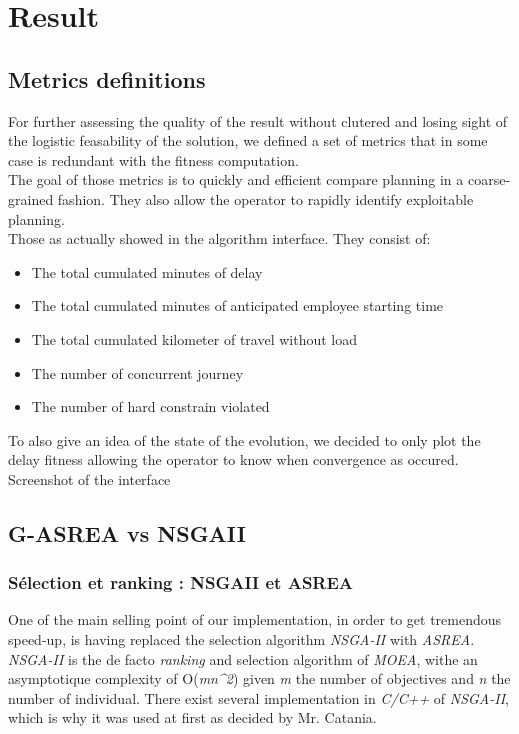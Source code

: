\documentclass[12pt]{memoir}
\begin{document}
\section{Result}
\subsection{Metrics definitions}
For further assessing the quality of the result without clutered and losing sight of the logistic feasability of the solution, we defined a set of metrics that in some case is redundant with the fitness computation. \\
The goal of those metrics is to quickly and efficient compare planning in a coarse-grained fashion. They also allow the operator to rapidly identify exploitable planning.\\
Those as actually showed in the algorithm interface. They consist of: 
\begin{itemize}
  \item The total cumulated minutes of delay
  \item The total cumulated minutes of anticipated employee starting time
  \item The total cumulated kilometer of travel without load
  \item The number of concurrent journey
  \item The number of hard constrain violated
\end{itemize}
To also give an idea of the state of the evolution, we decided to only plot the delay 
fitness allowing the operator to know when convergence as occured.
Screenshot of the interface 
\subsection{G-ASREA vs NSGAII}
\subsubsection{Sélection et ranking : NSGAII et
	ASREA}\label{suxe9lection-et-ranking-nsgaii-et-asrea}

One of the main selling point of our implementation, in order to get tremendous speed-up, is having replaced the selection algorithm \emph{NSGA-II\cite{deb2002fast}} with \emph{ASREA\cite{sharma2010archived,tsutsui2013massively}}.\\

\emph{NSGA-II} is the de facto \emph{ranking} and selection algorithm of \emph{MOEA}, withe an asymptotique complexity of O(\emph{mn\^{}2}) given \emph{m} the number of objectives and \emph{n} the number of individual.
There exist several implementation in \emph{C/C++} of \emph{NSGA-II}, which is why it was used at first as decided by  Mr. Catania.\\
\end{document}
